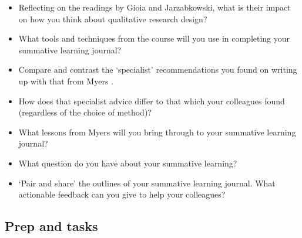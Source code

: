 \documentclass[]{book}
\theoremstyle{definition}
\theoremstyle{definition}
\theoremstyle{definition}
\theoremstyle{remark}
\begin{document}
\begin{itemize}
\item
  Reflecting on the readings by Gioia and Jarzabkowski, what is their
  impact on how you think about qualitative research design?
\item
  What tools and techniques from the course will you use in completing
  your summative learning journal?
\item
  Compare and contrast the `specialist' recommendations you found on
  writing up with that from Myers \autocite*[
  p.~221--250]{myers_2013_qualitativeresearchbusiness}.
\item
  How does that specialist advice differ to that which your colleagues
  found (regardless of the choice of method)?
\item
  What lessons from Myers \autocite*[
  p.~221--250]{myers_2013_qualitativeresearchbusiness} will you bring
  through to your summative learning journal?
\item
  What question do you have about your summative learning?
\item
  `Pair and share' the outlines of your summative learning journal. What
  actionable feedback can you give to help your colleagues?
\end{itemize}

\hypertarget{prep-and-tasks-10}{%
\subsection*{Prep and tasks}\label{prep-and-tasks-10}}
\end{document}
